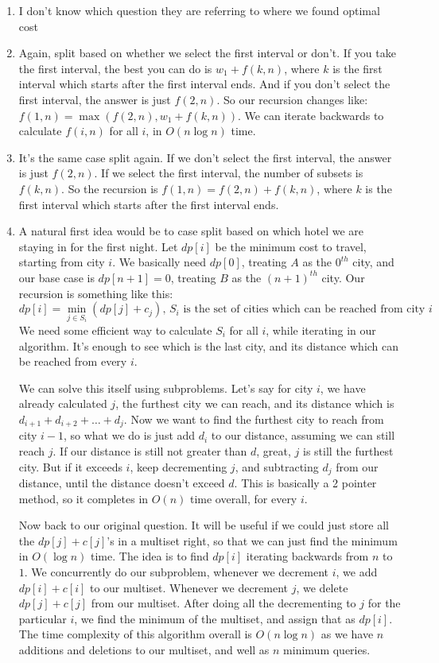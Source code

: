 \documentclass[12pt]{report}
\begin{document}
\begin{enumerate}[label=\textbf{\arabic*.}]
  \item I don't know which question they are referring to where we found optimal cost 
  
  \item Again, split based on whether we select the first interval or don't. If you take the first interval, the best you can do is $w_1 + f(k,n)$, where $k$ is the first interval which starts after
  the first interval ends. And if you don't select the first interval, the answer is just $f(2,n)$. So our recursion changes like: $f(1,n) = \max(f(2, n), w_1 + f(k,n))$. We can iterate backwards 
  to calculate $f(i,n)$ for all $i$, in $O(n \log n)$ time.

  \item It's the same case split again. If we don't select the first interval, the answer is just $f(2,n)$. If we select the first interval, the number of subsets is $f(k,n)$. So the recursion is
  $f(1,n) = f(2,n) + f(k,n)$, where $k$ is the first interval which starts after the first interval ends. 

  \item A natural first idea would be to case split based on which hotel we are staying in for the first night. Let $dp[i]$ be the minimum cost to travel, starting from city $i$. We basically need
  $dp[0]$, treating $A$ as the $0^{th}$ city, and our base case is $dp[n+1] = 0$, treating $B$ as the $(n+1)^{th}$ city. Our recursion is something like this:
  \[ dp[i] = \min_{j \in S_i} (dp[j] + c_j) \text{, $S_i$ is the set of cities which can be reached from city $i$ } \]
  We need some efficient way to calculate $S_i$ for all $i$, while iterating in our algorithm. It's enough to see which is the last city, and its distance which can be reached from every $i$.
  
  We can solve this itself using subproblems. Let's say for city $i$, we have already calculated $j$, the furthest city we can reach, and its distance which is $d_{i+1} + d_{i+2} + \dots + d_j$.
  Now we want to find the furthest city to reach from city $i-1$, so what we do is just add $d_i$ to our distance, assuming we can still reach $j$. If our distance is still not greater than $d$, 
  great, $j$ is still the furthest city. But if it exceeds $i$, keep decrementing $j$, and subtracting $d_j$ from our distance, until the distance doesn't exceed $d$. This is basically a 2 pointer
  method, so it completes in $O(n)$ time overall, for every $i$.

  Now back to our original question. It will be useful if we could just store all the $dp[j] + c[j]$'s in a multiset right, so that we can just find the minimum in $O(\log n)$ time. The idea is 
  to find $dp[i]$ iterating backwards from $n$ to $1$. We concurrently do our subproblem, whenever we decrement $i$, we add $dp[i] + c[i]$ to our multiset. Whenever we decrement $j$, we delete 
  $dp[j] + c[j]$ from our multiset. After doing all the decrementing to $j$ for the particular $i$, we find the minimum of the multiset, and assign that as $dp[i]$. The time complexity of this 
  algorithm overall is $O(n \log n)$ as we have $n$ additions and deletions to our multiset, and well as $n$ minimum queries.
  

\end{enumerate}
\end{document}
